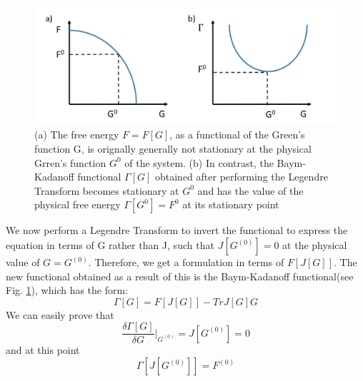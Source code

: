 \documentclass[10pt]{ruthesis}
\begin{document}
\begin{figure}[H]
\includegraphics[width=\columnwidth]{Legendre.jpg}
\caption{(a) The free energy $ F = F[G]$, as a functional of the Green’s function G, is orignally generally not  stationary at the physical Grren's function $G^0$ of the system. (b) In contrast, the Baym-Kadanoff functional $\Gamma[G]$ obtained after performing the Legendre Transform  becomes stationary at $G^0$  and has the value of the physical free energy $\Gamma[G^0] = F^0$ at its stationary point \label{Legendre}}
\end{figure} 

We now perform a Legendre Transform to invert the functional to express the equation in terms of G rather than J, such that $J[G^{(0)}]=0$ at the physical value of $G=G^{(0)}$. 
Therefore, we get a formulation in terms of $F[J[G]]$. The new functional obtained as a result of this is the Baym-Kadanoff functional(see Fig. \ref{Legendre}), which has the form:
\begin{equation}
\Gamma[G]= F[J[G]] -Tr J[G]G
\end{equation}
 We can easily prove that
 \begin{equation}
 \dfrac{\delta  \Gamma[G]}{\delta  G}\big|_{G^{(0)}}= J[G^{(0)}]=0 
 \end{equation}
 and at this point
 \begin{equation}
 \Gamma[ J[G^{(0)}]]= F^{(0)}
 \end{equation}
 
\end{document}
